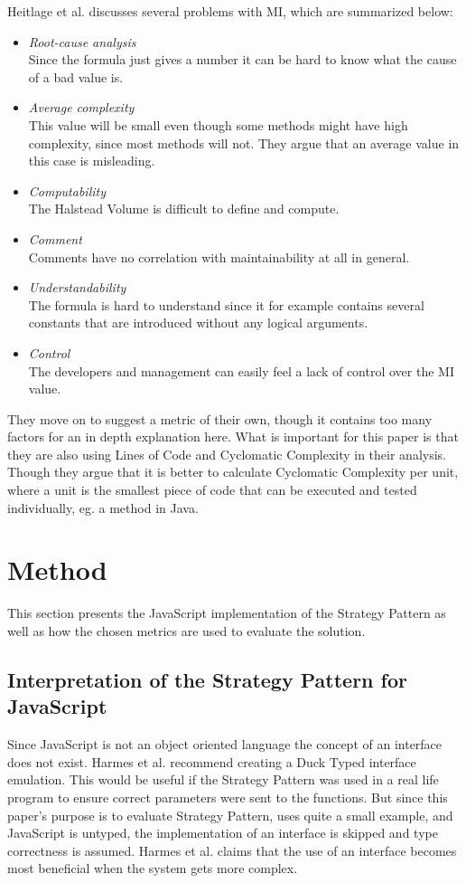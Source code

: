 \documentclass[conference, a4paper]{IEEEtran}
\begin{document}
Heitlage et al. discusses several problems with MI, which are summarized below:
\begin{itemize}
    \item \emph{Root-cause analysis} \\
    Since the formula just gives a number it can be hard to know what the cause of a bad value is.
    \item \emph{Average complexity} \\
    This value will be small even though some methods might have high complexity, since most methods will not. They argue that an average value in this case is misleading.
    \item \emph{Computability} \\
		The Halstead Volume is difficult to define and compute.
    \item \emph{Comment} \\
		Comments have no correlation with maintainability at all in general.
    \item \emph{Understandability} \\
		The formula is hard to understand since it for example contains several constants that are introduced without any logical arguments.
		\item \emph{Control} \\
		The developers and management can easily feel a lack of control over the MI value.
\end{itemize}
They move on to suggest a metric of their own, though it contains too many factors for an in depth explanation here. What is important for this paper is that they are also using Lines of Code and Cyclomatic Complexity in their analysis. Though they argue that it is better to calculate Cyclomatic Complexity per unit, where a unit is the smallest piece of code that can be executed and tested individually, eg. a method in Java.~\cite{bibitem:Maintainability}

\section{Method}
This section presents the JavaScript implementation of the Strategy Pattern as well as how the chosen metrics are used to evaluate the solution.

\subsection{Interpretation of the Strategy Pattern for JavaScript}
\label{sec:JavaScript}
Since JavaScript is not an object oriented language the concept of an interface does not exist. Harmes et al. recommend creating a Duck Typed interface emulation. This would be useful if the Strategy Pattern was used in a real life program to ensure correct parameters were sent to the functions. But since this paper's purpose is to evaluate Strategy Pattern, uses quite a small example, and JavaScript is untyped, the implementation of an interface is skipped and type correctness is assumed. Harmes et al. claims that the use of an interface becomes most beneficial when the system gets more complex.~\cite{bibitem:DiazHarmes}
\end{document}
